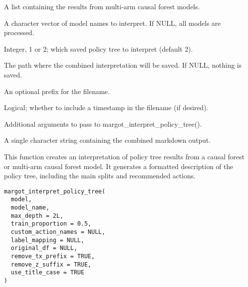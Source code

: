 \documentclass[a4paper]{book}
\begin{document}
\begin{Arguments}
\begin{ldescription}
\item[\code{models}] A list containing the results from multi-arm causal forest models.

\item[\code{model\_names}] A character vector of model names to interpret. If NULL, all models are processed.

\item[\code{max\_depth}] Integer, 1 or 2; which saved policy tree to interpret (default 2).

\item[\code{save\_path}] The path where the combined interpretation will be saved. If NULL, nothing is saved.

\item[\code{prefix}] An optional prefix for the filename.

\item[\code{include\_timestamp}] Logical; whether to include a timestamp in the filename (if desired).

\item[\code{...}] Additional arguments to pass to margot\_interpret\_policy\_tree().
\end{ldescription}
\end{Arguments}
%
\begin{Value}
A single character string containing the combined markdown output.
\end{Value}
%
\begin{Description}
This function creates an interpretation of policy tree results from a causal forest or multi-arm causal forest model.
It generates a formatted description of the policy tree, including the main splits and recommended actions.
\end{Description}
%
\begin{Usage}
\begin{verbatim}
margot_interpret_policy_tree(
  model,
  model_name,
  max_depth = 2L,
  train_proportion = 0.5,
  custom_action_names = NULL,
  label_mapping = NULL,
  original_df = NULL,
  remove_tx_prefix = TRUE,
  remove_z_suffix = TRUE,
  use_title_case = TRUE
)
\end{verbatim}
\end{Usage}
%
\end{document}
